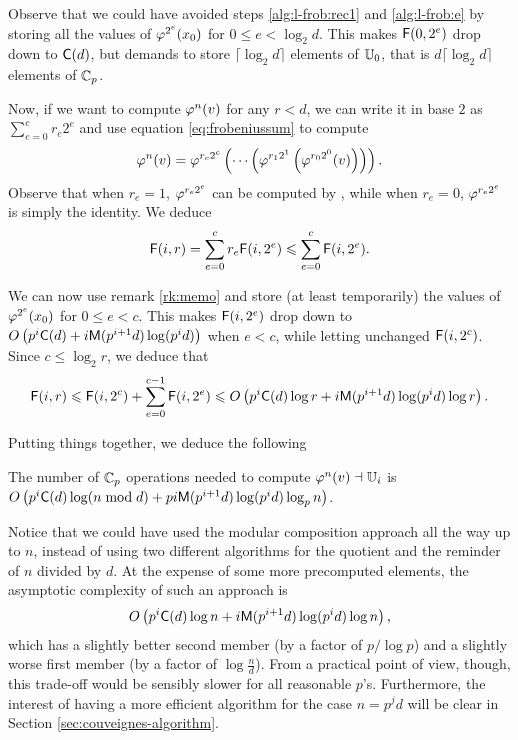 \begin{remark}
  \label{rk:memo}
  Observe that we could have avoided steps \ref{alg:l-frob:rec1} and
  \ref{alg:l-frob:e} by storing all the values of $\varphi^{2^e}(x_0)$
  for $0\le e<\log_2d$. This makes $\mathrm{\sf F}(0,2^e)$ drop down to
  $\mathrm{\sf C}(d)$, but demands to store $\lceil\log_2d\rceil$ elements
  of $\mathbb{U}_0$, that is $d\lceil\log_2d\rceil$ elements of $\mathbb{C}_p$.
\end{remark}

Now, if we want to compute $\varphi^n(v)$ for any $r<d$, we can write it
in base $2$ as $\sum_{e=0}^cr_e2^e$ and use equation
\eqref{eq:frobeniussum} to compute
\begin{equation*}
  \varphi^{n}(v) =
  \varphi^{r_c2^c}\left(\cdots\left(\varphi^{r_12^1}\left(\varphi^{r_02^0}(v)\right)\right)\right)
  \text{.}
\end{equation*}
Observe that when $r_e=1$, $\varphi^{r_e2^e}$ can be computed by
, while when $r_e=0$, $\varphi^{r_e2^e}$
is simply the identity. We deduce
\begin{equation*}
  \mathrm{\sf F}(i,r) = \sum_{e=0}^cr_e\mathrm{\sf F}(i,2^e)\leqslant
  \sum_{e=0}^{c}\mathrm{\sf F}(i,2^e)
  \text{.}
\end{equation*}

We can now use remark \ref{rk:memo} and store (at least temporarily)
the values of $\varphi^{2^e}(x_0)$ for $0\le e<c$. This makes
$\mathrm{\sf F}(i,2^e)$ drop down to $O\left(p^i\mathrm{\sf C}(d) +
i\mathrm{\sf M}(p^{i+1}d)\log(p^id)\right)$ when $e<c$, while letting unchanged
$\mathrm{\sf F}(i,2^c)$.  Since $c\le\log_2r$, we deduce that
\begin{equation*}
  \mathrm{\sf F}(i,r) \leqslant \mathrm{\sf F}(i,2^c) + \sum_{e=0}^{c-1}\mathrm{\sf F}(i,2^e)\leqslant
  O\left(p^i\mathrm{\sf C}(d)\log r + i\mathrm{\sf M}(p^{i+1}d)\log(p^id)\log r\right)
  \text{.}
\end{equation*}

Putting things together, we deduce the following
\sloppy
\begin{corollary}
  The number of $\mathbb{C}_p$ operations needed to compute
  $\varphi^n(v)\dashv\mathbb{U}_i$ is $O\left(p^i\mathrm{\sf C}(d)\log(n\bmod d) +
  pi\mathrm{\sf M}(p^{i+1}d)\log(p^id)\log_pn\right)$.
\end{corollary}
\fussy

Notice that we could have used the modular composition approach all
the way up to $n$, instead of using two different algorithms for the
quotient and the reminder of $n$ divided by $d$. At the expense of
some more precomputed elements, the asymptotic complexity of such an
approach is
\begin{equation*}
  O\left(p^i\mathrm{\sf C}(d)\log n + i\mathrm{\sf M}(p^{i+1}d)\log(p^id)\log n\right)
  \text{,}
\end{equation*}
which has a slightly better second member (by a factor of $p/\log p$)
and a slightly worse first member (by a factor of
$\log\frac{n}{d}$). From a practical point of view, though, this
trade-off would be sensibly slower for all reasonable
$p$'s. Furthermore, the interest of having a more efficient algorithm
for the case $n=p^jd$ will be clear in Section
\ref{sec:couveignes-algorithm}.



